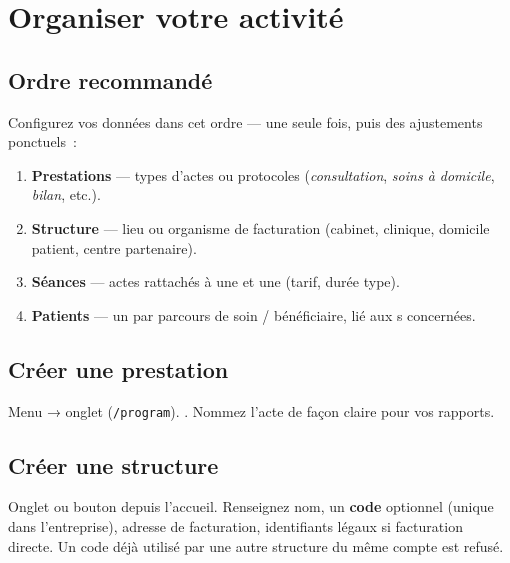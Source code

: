 \section{Organiser votre activité}
\label{sec:organisation}

\subsection{Ordre recommandé}

Configurez vos données dans cet ordre — une seule fois, puis des ajustements ponctuels~:

\begin{enumerate}[label=\textbf{\arabic*.}, leftmargin=*]
  \item \textbf{Prestations} — types d'actes ou protocoles (\emph{consultation}, \emph{soins à domicile}, \emph{bilan}, etc.).
  \item \textbf{Structure} — lieu ou organisme de facturation (cabinet, clinique, domicile patient, centre partenaire).
  \item \textbf{Séances} — actes rattachés à une \structure{} et une \prestation{} (tarif, durée type).
  \item \textbf{Patients} — un \patient{} par parcours de soin / bénéficiaire, lié aux \seance{}s concernées.
\end{enumerate}

\subsection{Créer une prestation}

\begin{workflowstep}[Prestations]
  Menu  → onglet  (\texttt{/program}). . Nommez l'acte de façon claire pour vos rapports.
\end{workflowstep}


\subsection{Créer une structure}

\begin{workflowstep}[Structure]
  Onglet  ou bouton depuis l'accueil. Renseignez nom, un \textbf{code} optionnel (unique dans l'entreprise), adresse de facturation, identifiants légaux si facturation directe. Un code déjà utilisé par une autre structure du même compte est refusé.
\end{workflowstep}

